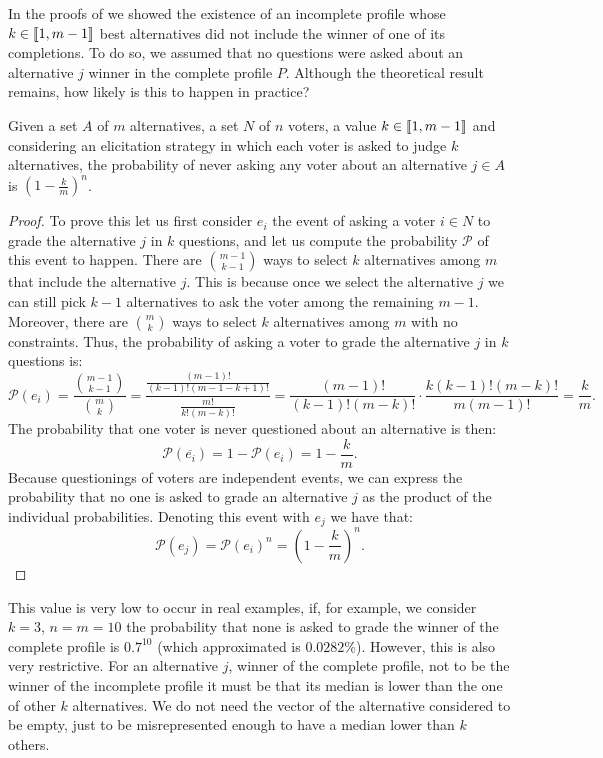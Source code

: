 	In the proofs of  we showed the existence of an incomplete profile whose $k \in \llbracket1,m-1\rrbracket$ best alternatives did not include the winner of one of its completions. To do so, we assumed that no questions were asked about an alternative $j$ winner in the complete profile $P$. Although the theoretical result remains, how likely is this to happen in practice?
	
	\begin{proposition}
		\label{pr:probabilityJ}
		Given a set $A$ of $m$ alternatives, a set $N$ of $n$ voters, a value $k\in\llbracket1,m-1\rrbracket$ and considering an elicitation strategy in which each voter is asked to judge $k$ alternatives, the probability of never asking any voter about an alternative $j\in A$ is $(1-\frac{k}{m})^n$.
	\end{proposition}
	\begin{proof}
		To prove this let us first consider $e_i$ the event of asking a voter $i\in N$ to grade the alternative $j$ in $k$ questions, and let us compute the probability $\mathcal{P}$ of this event to happen.
		There are $\binom{m-1}{k-1}$ ways to select $k$ alternatives among $m$ that include the alternative $j$. This is because once we select the alternative $j$ we can still pick $k-1$ alternatives to ask the voter among the remaining $m-1$.
		Moreover, there are $\binom{m}{k}$ ways to select $k$ alternatives among $m$ with no constraints. Thus, the probability of asking a voter to grade the alternative $j$ in $k$ questions is:
		\[\mathcal{P}(e_i)= \frac{\binom{m-1}{k-1}}{\binom{m}{k}}=\frac{\frac{(m-1)!}{(k-1)!(m-1-k+1)!}}{\frac{m!}{k!(m-k)!}}=\frac{(m-1)!}{(k-1)!(m-k)!}\cdot\frac{k(k-1)!(m-k)!}{m(m-1)!}=\frac{k}{m}.\]
		The probability that one voter is never questioned about an alternative is then:
		\[\mathcal{P}(\overline{e_i})=1-\mathcal{P}(e_i)=1-\frac{k}{m}.\]
		Because questionings of voters are independent events, we can express the probability that no one is asked to grade an alternative $j$ as the product of the individual probabilities. Denoting this event with $e_j$ we have that:
		\[\mathcal{P}(e_j)=\mathcal{P}(e_i)^n=\left(1-\frac{k}{m}\right)^n.\]
	\end{proof}
	This value is very low to occur in real examples, if, for example, we consider $k=3$, $n=m=10$ the probability that none is asked to grade the winner of the complete profile is $0.7^{10}$ (which approximated is $0.0282\%$).
	However, this is also very restrictive. For an alternative $j$, winner of the complete profile, not to be the winner of the incomplete profile it must be that its median is lower than the one of other $k$ alternatives. 
	We do not need the vector of the alternative considered to be empty, just to be misrepresented enough to have a median lower than $k$ others.

